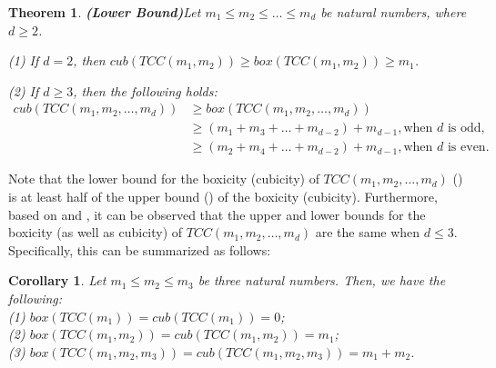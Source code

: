 \documentclass[twoside, 11pt]{article}
\newtheorem{theorem}{Theorem}
\newtheorem{corollary}{Corollary}
\newcommand{\M}{TCC(m_1,m_2,\dots,m_d)}
\begin{document}
\begin{theorem}\textbf{(Lower Bound)}\label{lower bound}
Let $m_1 \leq m_2 \leq \dots \leq m_d$ be natural numbers, where  $d \geq 2$.

\vspace{0.2cm}

\noindent (1) If $d=2$, then $cub(TCC(m_1,m_2)) \geq box(TCC(m_1,m_2)) \geq m_1$.

\vspace{0.2cm}

\noindent(2) If $d\geq 3$, then the following holds:
\begin{equation} \label{eq1}
\textstyle
\begin{aligned}
    cub(\M) &\geq box(\M) \\
            &\geq (m_1 + m_3 + \dots + m_{d-2}) + m_{d-1}, \text{when } d \text{ is odd}, \\
            &\geq (m_2 + m_4 + \dots + m_{d-2}) + m_{d-1}, \text{when } d \text{ is even}.
\end{aligned}
\end{equation}

\end{theorem}


Note that the lower bound for the boxicity (cubicity) of $\M$ () is at least half of the upper bound () of the boxicity (cubicity). Furthermore, based on  and , it can be observed that the upper and lower bounds for the boxicity (as well as cubicity) of $\M$ are the same when $d \leq 3$. Specifically, this can be summarized as follows:

\begin{corollary}\label{corollary: exact boxicity}
    Let $m_1 \leq m_2 \leq m_3$ be three natural numbers. Then, we have the following:\\
    (1) $box(TCC(m_1))=cub(TCC(m_1))=0$;\\
    (2) $box(TCC(m_1,m_2))=cub(TCC(m_1,m_2))=m_1$;\\
    (3) $box(TCC(m_1,m_2,m_3))=cub(TCC(m_1,m_2,m_3))=m_1+m_2$.
\end{corollary}
\end{document}
